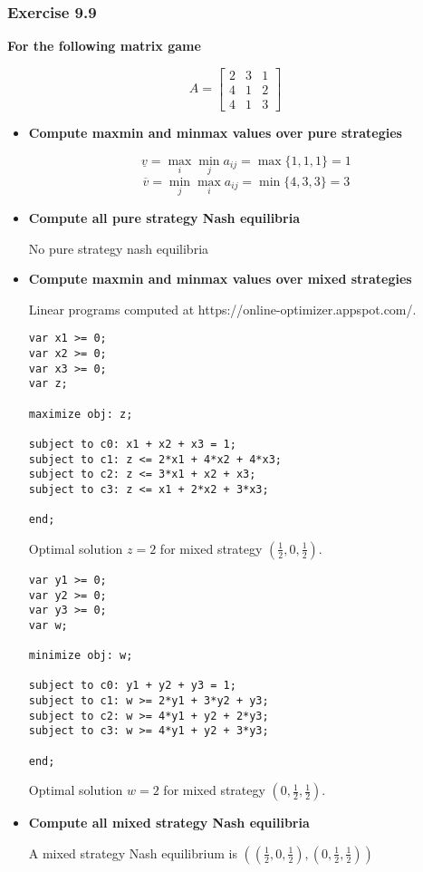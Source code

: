 \documentclass[12pt, a4paper]{article}
\begin{document}
\subsubsection*{Exercise 9.9}

\textbf{For the following matrix game}

    \[A = \begin{bmatrix}
        2 & 3 & 1 \\
        4 & 1 & 2 \\
        4 & 1 & 3
    \end{bmatrix}\]

\begin{itemize}
    \item \textbf{Compute maxmin and minmax values over pure strategies}
    
    \[ \underline{v} = \max_i \min_j a_{ij} = \max\{1, 1, 1\} = 1 \]
    \[ \overline{v} = \min_j \max_i a_{ij} = \min\{4, 3, 3\} = 3 \]


    \item \textbf{Compute all pure strategy Nash equilibria}
    
    No pure strategy nash equilibria

    \item \textbf{Compute maxmin and minmax values over mixed strategies}
    
    Linear programs computed at https://online-optimizer.appspot.com/.

    \begin{verbatim}
var x1 >= 0;
var x2 >= 0;
var x3 >= 0;
var z;

maximize obj: z;

subject to c0: x1 + x2 + x3 = 1;
subject to c1: z <= 2*x1 + 4*x2 + 4*x3;
subject to c2: z <= 3*x1 + x2 + x3;
subject to c3: z <= x1 + 2*x2 + 3*x3;

end;
    \end{verbatim}

    Optimal solution $z=2$ for mixed strategy $\left(\frac{1}{2}, 0, \frac{1}{2}\right)$.

    \begin{verbatim}
var y1 >= 0;
var y2 >= 0;
var y3 >= 0;
var w;

minimize obj: w;

subject to c0: y1 + y2 + y3 = 1;
subject to c1: w >= 2*y1 + 3*y2 + y3;
subject to c2: w >= 4*y1 + y2 + 2*y3;
subject to c3: w >= 4*y1 + y2 + 3*y3;

end;
    \end{verbatim}

    Optimal solution $w=2$ for mixed strategy $\left(0, \frac{1}{2}, \frac{1}{2}\right)$.

    \item \textbf{Compute all mixed strategy Nash equilibria}
    
    A mixed strategy Nash equilibrium is $\left(\left(\frac{1}{2}, 0, \frac{1}{2}\right), \left(0, \frac{1}{2}, \frac{1}{2} \right) \right)$

\end{itemize}
\end{document}

